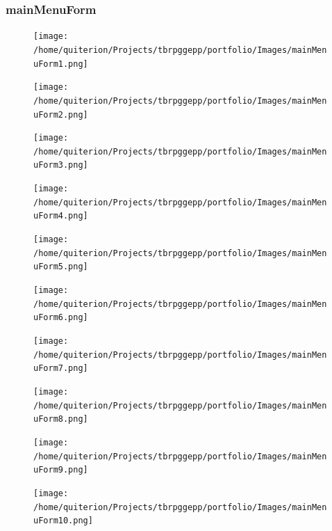 \documentclass{article} \usepackage[margin=1in,headheight=57pt,headsep=0.1in]{geometry}
\begin{document}
\subsubsection{mainMenuForm}
\begin{figure}[H]
	\centering
	\texttt{[image: /home/quiterion/Projects/tbrpggepp/portfolio/Images/mainMenuForm1.png]}
\end{figure}
\begin{figure}[H]
	\centering
	\texttt{[image: /home/quiterion/Projects/tbrpggepp/portfolio/Images/mainMenuForm2.png]}
\end{figure}
\begin{figure}[H]
	\centering
	\texttt{[image: /home/quiterion/Projects/tbrpggepp/portfolio/Images/mainMenuForm3.png]}
\end{figure}
\begin{figure}[H]
	\centering
	\texttt{[image: /home/quiterion/Projects/tbrpggepp/portfolio/Images/mainMenuForm4.png]}
\end{figure}
\begin{figure}[H]
	\centering
	\texttt{[image: /home/quiterion/Projects/tbrpggepp/portfolio/Images/mainMenuForm5.png]}
\end{figure}
\begin{figure}[H]
	\centering
	\texttt{[image: /home/quiterion/Projects/tbrpggepp/portfolio/Images/mainMenuForm6.png]}
\end{figure}
\begin{figure}[H]
	\centering
	\texttt{[image: /home/quiterion/Projects/tbrpggepp/portfolio/Images/mainMenuForm7.png]}
\end{figure}
\begin{figure}[H]
	\centering
	\texttt{[image: /home/quiterion/Projects/tbrpggepp/portfolio/Images/mainMenuForm8.png]}
\end{figure}
\begin{figure}[H]
	\centering
	\texttt{[image: /home/quiterion/Projects/tbrpggepp/portfolio/Images/mainMenuForm9.png]}
\end{figure}
\begin{figure}[H]
	\centering
	\texttt{[image: /home/quiterion/Projects/tbrpggepp/portfolio/Images/mainMenuForm10.png]}
\end{figure}
\end{document}

